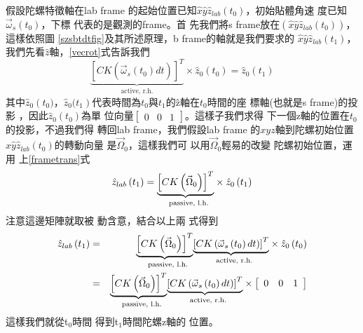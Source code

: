 \documentclass[12pt,a4paper]{article}
\begin{document}
假設陀螺特徵軸在lab frame%
的起始位置已知$\hat{x}\hat{y}\hat{z%
}_{lab}(t_{0})$，初始貼體角速%
度已知$\vec{\omega}_{s}(t_{0})$，下標%
代表的是觀測的frame。首%
先我們將s frame放在$\left( \hat{x}\hat{y}%
\hat{z}_{lab}(t_{0})\right) $，這樣依照圖%
\ref{szsbtdtfig}及其所述原理，b
frame的軸就是我們要求的%
$\hat{x}\hat{y}\hat{z}_{lab}(t_{1})$，我們先看$%
\hat{z}$軸，\ref{vecrot}式告訴我們%
\begin{equation*}
\underset{\text{active, r.h.}}{\underbrace{\left[ CK\left( \vec{\omega}%
_{s}\left( t_{0}\right) dt\right) \right] ^{T}}}\times \hat{z}_{0}\left(
t_{0}\right) =\hat{z}_{0}\left( t_{1}\right)
\end{equation*}%
其中$\hat{z}_{0}\left( t_{0})\text{，}\hat{z}%
_{0}(t_{1}\right) $代表時間為$t_{0}$與$%
t_{1}$的\^{z}軸在$t_{0}$時間的座%
標軸(也就是s frame)的投影%
，因此$\hat{z}_{0}\left( t_{0}\right) $為單%
位向量$\left[ 
\begin{array}{ccc}
0 & 0 & 1%
\end{array}%
\right] $。這樣子我們求得%
下一個z軸的位置在$t_{0}$%
的投影，不過我們得%
轉回lab frame，我們假設lab frame%
的$xyz$軸到陀螺初始位置%
$\hat{x}\hat{y}\hat{z}_{lab}(t_{0})$的轉動向量%
是$\vec{\Omega}_{0}， $這樣我們可%
以用$\vec{\Omega}_{0}$輕易的改變%
陀螺初始位置，運用%
上\ref{frametrans}式%
\begin{equation*}
\hat{z}_{lab}\left( t_{1}\right) =\underset{\text{passive, l.h.}}{%
\underbrace{\left[ CK\left( \vec{\Omega}_{0}\right) \right] ^{T}}}\times 
\hat{z}_{0}\left( t_{1}\right)
\end{equation*}%
注意這邊矩陣就取被%
動含意，結合以上兩%
式得到%
\begin{eqnarray*}
\hat{z}_{lab}\left( t_{1}\right) &=&\underset{\text{passive, l.h.}}{%
\underbrace{\left[ CK\left( \vec{\Omega}_{0}\right) \right] ^{T}}}\underset{%
\text{active, r.h.}}{\underbrace{\left[ CK\left( \vec{\omega}_{s}\left(
t_{0}\right) dt\right) \right] ^{T}}}\times \hat{z}_{0}\left( t_{0}\right) \\
&=&\underset{\text{passive, l.h.}}{\underbrace{\left[ CK\left( \vec{\Omega}%
_{0}\right) \right] ^{T}}}\underset{\text{active, r.h.}}{\underbrace{\left[
CK\left( \vec{\omega}_{s}\left( t_{0}\right) dt\right) \right] ^{T}}}\times %
\left[ 
\begin{array}{ccc}
0 & 0 & 1%
\end{array}%
\right]
\end{eqnarray*}%
這樣我們就從t$_{0}$時間%
得到t$_{1}$時間陀螺z軸的%
位置。
\end{document}
